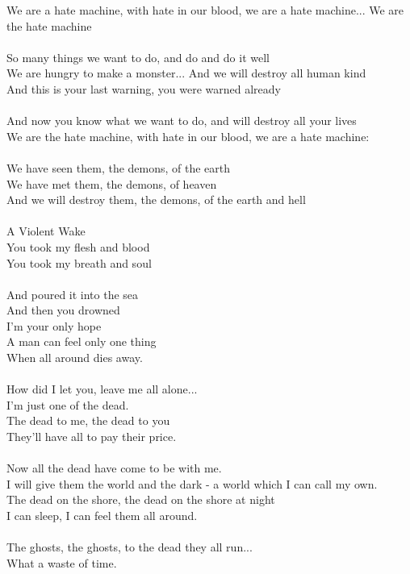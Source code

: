 \documentclass[11pt]{article}
\begin{document}
We are a hate machine, with hate in our blood, we are a hate machine... We are the hate machine\\
\\
So many things we want to do, and do and do it well\\
We are hungry to make a monster... And we will destroy all human kind\\
And this is your last warning, you were warned already\\
\\
And now you know what we want to do, and will destroy all your lives\\
We are the hate machine, with hate in our blood, we are a hate machine:\\
\\
We have seen them, the demons, of the earth\\
We have met them, the demons, of heaven\\
And we will destroy them, the demons, of the earth and hell\\
\\
A Violent Wake\\
You took my flesh and blood\\
You took my breath and soul\\
\\
And poured it into the sea\\
And then you drowned\\
I'm your only hope\\
A man can feel only one thing\\
When all around dies away.\\
\\
How did I let you, leave me all alone...\\
I'm just one of the dead.\\
The dead to me, the dead to you\\
They'll have all to pay their price.\\
\\
Now all the dead have come to be with me.\\
I will give them the world and the dark - a world which I can call my own.\\
The dead on the shore, the dead on the shore at night\\
I can sleep, I can feel them all around.\\
\\
The ghosts, the ghosts, to the dead they all run...\\
What a waste of time.\\
\end{document}

